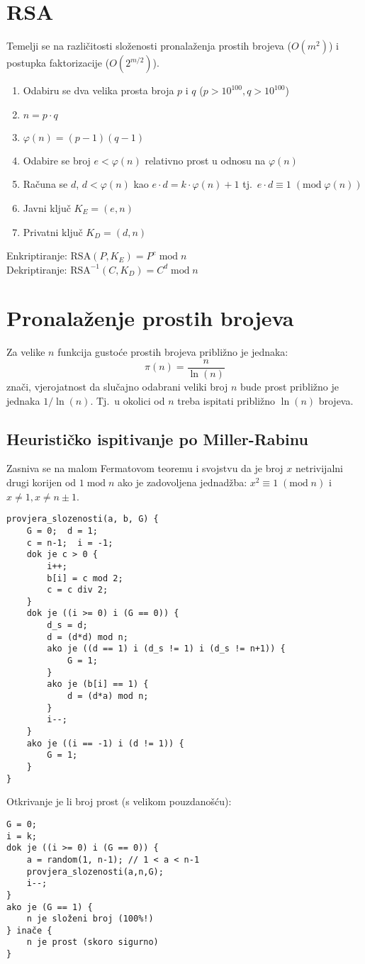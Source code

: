 \documentclass[11pt]{article}
\begin{document}
\section{RSA}
Temelji se na različitosti složenosti pronalaženja prostih brojeva ($O(m^2)$) i postupka faktorizacije ($O(2^{m/2})$).
\begin{enumerate}
  \item Odabiru se dva velika prosta broja $p$ i $q$ ($p > 10^{100}, q > 10^{100}$)
  \item $n = p\cdot q$
  \item $\varphi(n)=(p-1)(q-1)$
  \item Odabire se broj $e < \varphi(n)$ relativno prost u odnosu na $\varphi(n)$
  \item Računa se $d$, $d < \varphi(n)$ kao $e\cdot d = k\cdot \varphi(n)+1$ tj.\ $e\cdot d \equiv 1 \;(\text{mod}\; \varphi(n))$
  \item Javni ključ $K_E = (e, n)$
  \item Privatni ključ $K_D = (d, n)$
\end{enumerate}
Enkriptiranje: $\text{RSA}(P, K_E) = P^e \;\text{mod}\; n$\\
Dekriptiranje: $\text{RSA}^{-1}(C, K_D) = C^d \;\text{mod}\; n$

\section{Pronalaženje prostih brojeva}
Za velike $n$ funkcija gustoće prostih brojeva približno je jednaka:
$$\pi(n) = \frac{n}{\ln(n)}$$
znači, vjerojatnost da slučajno odabrani veliki broj $n$ bude prost približno je jednaka $1/\ln(n)$. Tj.\ u okolici od $n$ treba ispitati približno $\ln(n)$ brojeva.

\subsection{Heurističko ispitivanje po Miller-Rabinu}
Zasniva se na malom Fermatovom teoremu i svojstvu da je broj $x$ netrivijalni drugi korijen od $1 \;\text{mod}\; n$ ako je zadovoljena jednadžba: $x^2 \equiv 1\; (\text{mod}\; n)$ i $x \ne 1, x \ne n \pm 1$.
\begin{verbatim}
provjera_slozenosti(a, b, G) {
    G = 0;  d = 1;
    c = n-1;  i = -1;
    dok je c > 0 {
        i++;
        b[i] = c mod 2;
        c = c div 2;
    }
    dok je ((i >= 0) i (G == 0)) {
        d_s = d;
        d = (d*d) mod n;
        ako je ((d == 1) i (d_s != 1) i (d_s != n+1)) {
            G = 1;
        }
        ako je (b[i] == 1) {
            d = (d*a) mod n;
        }
        i--;
    }
    ako je ((i == -1) i (d != 1)) {
        G = 1;
    }
}
\end{verbatim}
\newpage
Otkrivanje je li broj prost (s velikom pouzdanošću):
\begin{verbatim}
G = 0;
i = k;
dok je ((i >= 0) i (G == 0)) {
    a = random(1, n-1); // 1 < a < n-1
    provjera_slozenosti(a,n,G);
    i--;
}
ako je (G == 1) {
    n je složeni broj (100%!)
} inače {
    n je prost (skoro sigurno)
}
\end{verbatim}
\end{document}
